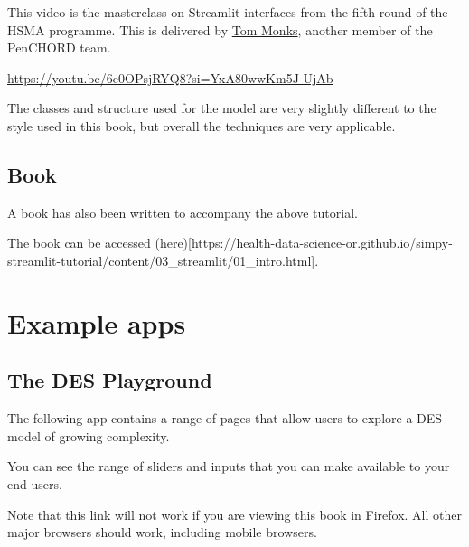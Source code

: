 \documentclass[
  letterpaper,
  DIV=11,
  numbers=noendperiod]{scrreprt}
\begin{document}
This video is the masterclass on Streamlit interfaces from the fifth
round of the HSMA programme. This is delivered by
\href{https://orcid.org/0000-0003-2631-4481}{Tom Monks}, another member
of the PenCHORD team.

\url{https://youtu.be/6e0OPsjRYQ8?si=YxA80wwKm5J-UjAb}

The classes and structure used for the model are very slightly different
to the style used in this book, but overall the techniques are very
applicable.

\subsection{Book}\label{book}

A book has also been written to accompany the above tutorial.

The book can be accessed
(here){[}https://health-data-science-or.github.io/simpy-streamlit-tutorial/content/03\_streamlit/01\_intro.html{]}.

\section{Example apps}\label{example-apps}

\subsection{The DES Playground}\label{the-des-playground}

The following app contains a range of pages that allow users to explore
a DES model of growing complexity.

You can see the range of sliders and inputs that you can make available
to your end users.

\begin{tcolorbox}[enhanced jigsaw, colframe=quarto-callout-warning-color-frame, bottomtitle=1mm, breakable, rightrule=.15mm, coltitle=black, colbacktitle=quarto-callout-warning-color!10!white, opacityback=0, leftrule=.75mm, arc=.35mm, toptitle=1mm, title=\textcolor{quarto-callout-warning-color}{\faExclamationTriangle}\hspace{0.5em}{Warning}, titlerule=0mm, colback=white, toprule=.15mm, bottomrule=.15mm, left=2mm, opacitybacktitle=0.6]

Note that this link will not work if you are viewing this book in
Firefox. All other major browsers should work, including mobile
browsers.

\end{tcolorbox}
\end{document}
